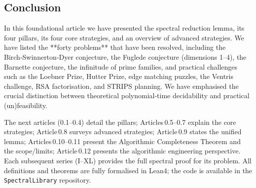 \documentclass[11pt,a4paper]{article}
\begin{document}
\subsection{Conclusion}

In this foundational article we have presented the spectral reduction lemma, its four pillars, its four core strategies, and an overview of advanced strategies. We have listed the **forty problems** that have been resolved, including the Birch‑Swinnerton‑Dyer conjecture, the Fuglede conjecture (dimensions 1–4), the Barnette conjecture, the infinitude of prime families, and practical challenges such as the Loebner Prize, Hutter Prize, edge matching puzzles, the Ventris challenge, RSA factorisation, and STRIPS planning. We have emphasised the crucial distinction between theoretical polynomial‑time decidability and practical (un)feasibility.

The next articles (0.1–0.4) detail the pillars; Articles 0.5–0.7 explain the core strategies; Article 0.8 surveys advanced strategies; Article 0.9 states the unified lemma; Articles 0.10–0.11 present the Algorithmic Completeness Theorem and the scope/limits; Article 0.12 presents the algorithmic engineering perspective. Each subsequent series (I–XL) provides the full spectral proof for its problem. All definitions and theorems are fully formalised in Lean4; the code is available in the \texttt{SpectralLibrary} repository.
\end{document}
